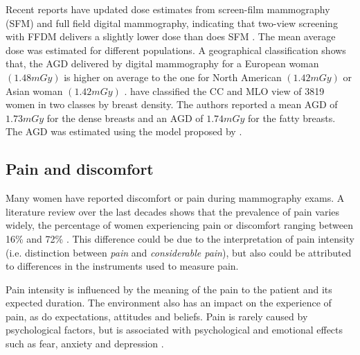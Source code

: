 Recent reports have updated dose estimates from screen-film mammography (SFM) and full field digital mammography, indicating that two-view screening with FFDM delivers a slightly lower dose than does SFM . The mean average dose was estimated for different populations. A geographical classification shows that, the AGD delivered by digital mammography for a European woman  $(1.48 mGy)$ is higher on average to the one for North American $(1.42 mGy)$ or Asian woman $(1.42 mGy)$ \citep{geeraert_breast_2012}. \cite{osteraas_average_2018} have classified the CC and MLO view of 3819 women in two classes by breast density. The authors reported a mean AGD of $1.73 mGy$ for the dense breasts and an AGD of $1.74 mGy$ for the fatty breasts. The AGD was estimated using the model proposed by \cite{dance_additional_2000} .  


\subsection{Pain and discomfort}
Many women have reported discomfort or pain during mammography exams. A literature review over the last decades shows that the  prevalence of pain varies widely, the percentage of women experiencing pain or discomfort ranging between 16\% and 72\% \citep{keemers_pain_2000, peipins_impact_2006,dullum_rates_2000, whelehan_effect_2013}. This difference could be due to the interpretation of pain intensity (i.e. distinction between \textit{pain} and \textit{considerable pain}),  but also could be attributed to differences in the instruments used to measure pain. 

Pain intensity is influenced by the meaning of the pain to the patient and its expected duration. The environment also has an impact on the experience of pain, as do expectations, attitudes and beliefs. Pain is rarely caused by psychological factors, but is associated with psychological and emotional effects such as fear, anxiety and
depression \citep{williamson_pain_2005}.

